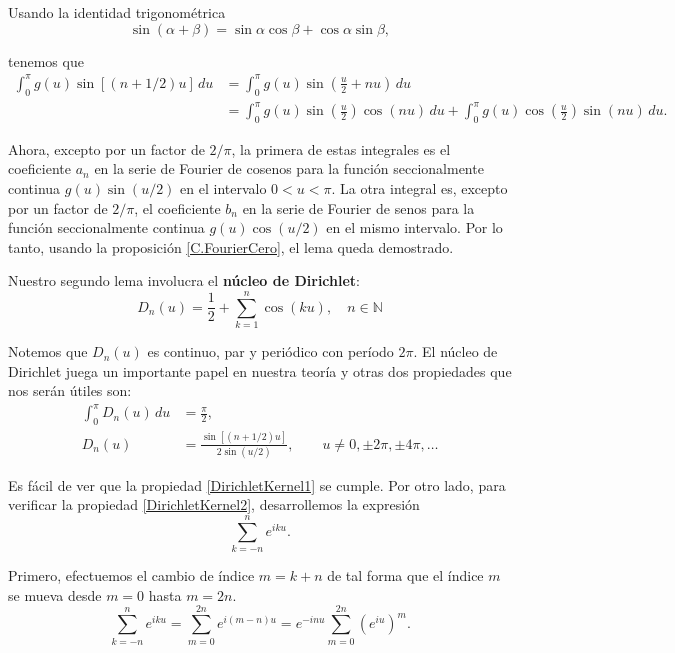 \begin{demo}
Usando la identidad trigonométrica 
$$\sin(\alpha + \beta) = \sin \alpha \cos \beta + \cos \alpha \sin \beta,$$

tenemos que
\begin{align*}
    \int_0^{\pi} g(u) \sin [(n + 1/2)u] \,du &= \int_0^{\pi} g(u) \sin \left( \frac{u}{2} + n u\right) \,du \\
    &= \int_0^{\pi} g(u) \sin\left( \frac{u}{2}\right) \cos(nu) \,du + \int_0^{\pi} g(u) \cos \left( \frac{u}{2}\right) \sin(nu) \,du.
\end{align*}

Ahora, excepto por un factor de $2/\pi$, la primera de estas integrales es el coeficiente $a_n$ en la serie de Fourier de cosenos para la función seccionalmente continua $g(u) \sin(u/2)$ en el intervalo $0 < u < \pi$. La otra integral es, excepto por un factor de $2/\pi$, el coeficiente $b_n$ en la serie de Fourier de senos para la función seccionalmente continua $g(u) \cos(u/2)$ en el mismo intervalo. Por lo tanto, usando la proposición \ref{C.FourierCero}, el lema queda demostrado.
\end{demo}

\newpage

Nuestro segundo lema involucra el \textbf{núcleo de Dirichlet}:
  \begin{equation}
  \boxed{  D_n(u) = \frac{1}{2} + \sum_{k=1}^n \cos(ku), \quad n \in \mathbb{N}} \label{DirichletKernel}
\end{equation}  

Notemos que $D_n(u)$ es continuo, par y periódico con período $2\pi$. El núcleo de Dirichlet juega un importante papel en nuestra teoría y otras dos propiedades que nos serán útiles son:
\begin{align}
    \int_0^{\pi} D_n(u) \,du &= \frac{\pi}{2}, \label{DirichletKernel1} \\
    D_n(u) &= \frac{\sin[(n+1/2)u]}{2 \sin(u/2)}, \qquad u \neq 0, \pm 2\pi, \pm 4\pi, \dots \label{DirichletKernel2}
\end{align}

Es fácil de ver que la propiedad \eqref{DirichletKernel1} se cumple. Por otro lado, para verificar la propiedad \eqref{DirichletKernel2},  desarrollemos la expresión
$$ \sum_{k = -n}^{n} e^{i k u}.$$

Primero, efectuemos el cambio de índice $m = k + n$ de tal forma que el índice $m$ se mueva desde $m = 0$ hasta $m = 2n$.
$$ \sum_{k = -n}^{n} e^{i k u} = \sum_{m = 0}^{2n} e^{i(m-n)u} = e^{-inu} \sum_{m=0}^{2n}\left( e^{iu}\right)^m.$$

